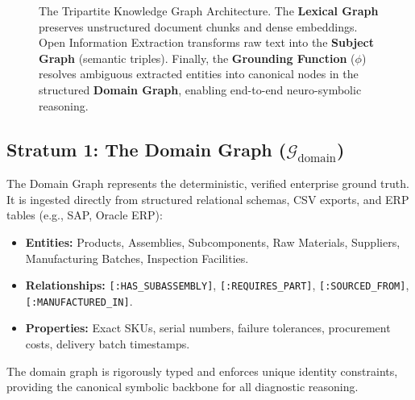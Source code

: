 \documentclass[10pt,twocolumn,letterpaper]{article}
\begin{document}
\begin{figure}[htbp]
\caption{The Tripartite Knowledge Graph Architecture. The \textbf{Lexical Graph} preserves unstructured document chunks and dense embeddings. Open Information Extraction transforms raw text into the \textbf{Subject Graph} (semantic triples). Finally, the \textbf{Grounding Function} ($\phi$) resolves ambiguous extracted entities into canonical nodes in the structured \textbf{Domain Graph}, enabling end-to-end neuro-symbolic reasoning.}
\label{fig:tripartite_architecture}
\end{figure}

\subsection{Stratum 1: The Domain Graph ($\mathcal{G}_{\text{domain}}$)}
The Domain Graph represents the deterministic, verified enterprise ground truth. It is ingested directly from structured relational schemas, CSV exports, and ERP tables (e.g., SAP, Oracle ERP):
\begin{itemize}
    \item \textbf{Entities:} Products, Assemblies, Subcomponents, Raw Materials, Suppliers, Manufacturing Batches, Inspection Facilities.
    \item \textbf{Relationships:} \texttt{[:HAS\_SUBASSEMBLY]}, \texttt{[:REQUIRES\_PART]}, \texttt{[:SOURCED\_FROM]}, \texttt{[:MANUFACTURED\_IN]}.
    \item \textbf{Properties:} Exact SKUs, serial numbers, failure tolerances, procurement costs, delivery batch timestamps.
\end{itemize}
The domain graph is rigorously typed and enforces unique identity constraints, providing the canonical symbolic backbone for all diagnostic reasoning.
\end{document}
